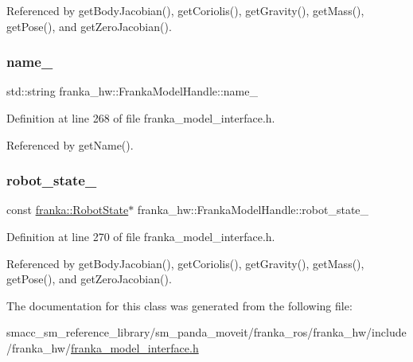 Referenced by get\+Body\+Jacobian(), get\+Coriolis(), get\+Gravity(), get\+Mass(), get\+Pose(), and get\+Zero\+Jacobian().

\mbox{\label{classfranka__hw_1_1FrankaModelHandle_ab2e979b4a0e4ca3d68488f2d0432c066}} 
\subsubsection{\texorpdfstring{name\+\_\+}{name\_}}
{\footnotesize\ttfamily std\+::string franka\+\_\+hw\+::\+Franka\+Model\+Handle\+::name\+\_\+\hspace{0.3cm}{\ttfamily [private]}}



Definition at line 268 of file franka\+\_\+model\+\_\+interface.\+h.



Referenced by get\+Name().

\mbox{\label{classfranka__hw_1_1FrankaModelHandle_a16192f263ce4709d99f557c6d8fabeb1}} 
\subsubsection{\texorpdfstring{robot\+\_\+state\+\_\+}{robot\_state\_}}
{\footnotesize\ttfamily const \hyperlink{structfranka_1_1RobotState}{franka\+::\+Robot\+State}$\ast$ franka\+\_\+hw\+::\+Franka\+Model\+Handle\+::robot\+\_\+state\+\_\+\hspace{0.3cm}{\ttfamily [private]}}



Definition at line 270 of file franka\+\_\+model\+\_\+interface.\+h.



Referenced by get\+Body\+Jacobian(), get\+Coriolis(), get\+Gravity(), get\+Mass(), get\+Pose(), and get\+Zero\+Jacobian().



The documentation for this class was generated from the following file\+:\begin{DoxyCompactItemize}
\item 
smacc\+\_\+sm\+\_\+reference\+\_\+library/sm\+\_\+panda\+\_\+moveit/franka\+\_\+ros/franka\+\_\+hw/include/franka\+\_\+hw/\hyperlink{franka__model__interface_8h}{franka\+\_\+model\+\_\+interface.\+h}\end{DoxyCompactItemize}
